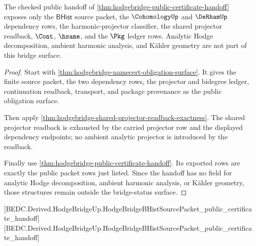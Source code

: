 \begin{theorem}
\label{thm:hodgebridge-bridge-status-surface}
The checked public handoff of
\autoref{thm:hodgebridge-public-certificate-handoff} exposes only the
$\mathsf{BHist}$ source packet, the $\CohomologyUp$ and $\DeRhamUp$ dependency
rows, the harmonic-projector classifier, the shared projector readback,
$\Cont$, $\hsame$, and the $\Pkg$ ledger rows. Analytic Hodge decomposition,
ambient harmonic analysis, and K\"{a}hler geometry are not part of this bridge
surface.
\end{theorem}
\begin{proof}
Start with \autoref{thm:hodgebridge-namecert-obligation-surface}. It gives the
finite source packet, the two dependency rows, the projector and bidegree
ledger, continuation readback, transport, and package provenance as the public
obligation surface.

Then apply
\autoref{thm:hodgebridge-shared-projector-readback-exactness}. The shared
projector readback is exhausted by the carried projector row and the displayed
dependency endpoints; no ambient analytic projector is introduced by the
readback.

Finally use \autoref{thm:hodgebridge-public-certificate-handoff}. Its exported
rows are exactly the public packet rows just listed. Since the handoff has no
field for analytic Hodge decomposition, ambient harmonic analysis, or K\"{a}hler
geometry, those structures remain outside the bridge-status surface.
\end{proof}

[BEDC.Derived.HodgeBridgeUp.HodgeBridgeBHistSourcePacket\_public\_certificate\_handoff]
[BEDC.Derived.HodgeBridgeUp.HodgeBridgeBHistSourcePacket\_public\_certificate\_handoff]

